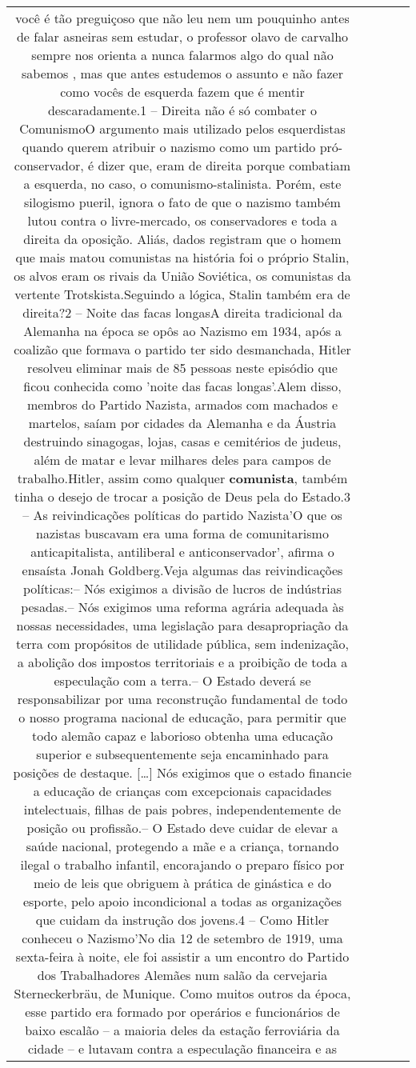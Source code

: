 \documentclass[11pt]{article}
\newlength\mylength
\begin{document}
\begin{center}
\begin{longtable}{|C{.65\mylength}|C{.30\mylength}|C{.12\mylength}|C{.12\mylength}|C{.12\mylength}|}
  \small você é tão preguiçoso que não leu nem um pouquinho antes de falar asneiras sem estudar, o professor olavo de carvalho sempre nos orienta a nunca falarmos algo do qual não sabemos , mas que antes estudemos o assunto e não fazer como vocês de esquerda fazem que é mentir descaradamente.1 – Direita não é só combater o ComunismoO argumento mais utilizado pelos esquerdistas quando querem atribuir o nazismo como um partido pró-conservador, é dizer que, eram de direita porque combatiam a esquerda, no caso, o comunismo-stalinista. Porém, este silogismo pueril, ignora o fato de que o nazismo também lutou contra o livre-mercado, os conservadores e toda a direita da oposição. Aliás, dados registram que o homem que mais matou comunistas na história foi o próprio Stalin, os alvos eram os rivais da União Soviética, os comunistas da vertente Trotskista.Seguindo a lógica, Stalin também era de direita?2 – Noite das facas longasA direita tradicional da Alemanha na época se opôs ao Nazismo em 1934, após a coalizão que formava o partido ter sido desmanchada, Hitler resolveu eliminar mais de 85 pessoas neste episódio que ficou conhecida como 'noite das facas longas'.Alem disso, membros do Partido Nazista, armados com machados e martelos, saíam por cidades da Alemanha e da Áustria destruindo sinagogas, lojas, casas e cemitérios de judeus, além de matar e levar milhares deles para campos de trabalho.Hitler, assim como qualquer \textbf{comunista}, também tinha o desejo de trocar a posição de Deus pela do Estado.3 – As reivindicações políticas do partido Nazista'O que os nazistas buscavam era uma forma de comunitarismo anticapitalista, antiliberal e anticonservador', afirma o ensaísta Jonah Goldberg.Veja algumas das reivindicações políticas:– Nós exigimos a divisão de lucros de indústrias pesadas.– Nós exigimos uma reforma agrária adequada às nossas necessidades, uma legislação para desapropriação da terra com propósitos de utilidade pública, sem indenização, a abolição dos impostos territoriais e a proibição de toda a especulação com a terra.– O Estado deverá se responsabilizar por uma reconstrução fundamental de todo o nosso programa nacional de educação, para permitir que todo alemão capaz e laborioso obtenha uma educação superior e subsequentemente seja encaminhado para posições de destaque. […] Nós exigimos que o estado financie a educação de crianças com excepcionais capacidades intelectuais, filhas de pais pobres, independentemente de posição ou profissão.– O Estado deve cuidar de elevar a saúde nacional, protegendo a mãe e a criança, tornando ilegal o trabalho infantil, encorajando o preparo físico por meio de leis que obriguem à prática de ginástica e do esporte, pelo apoio incondicional a todas as organizações que cuidam da instrução dos jovens.4 – Como Hitler conheceu o Nazismo'No dia 12 de setembro de 1919, uma sexta-feira à noite, ele foi assistir a um encontro do Partido dos Trabalhadores Alemães num salão da cervejaria Sterneckerbräu, de Munique. Como muitos outros da época, esse partido era formado por operários e funcionários de baixo escalão – a maioria deles da estação ferroviária da cidade – e lutavam contra a especulação financeira e as 
\end{longtable}
\end{center}
\end{document}
